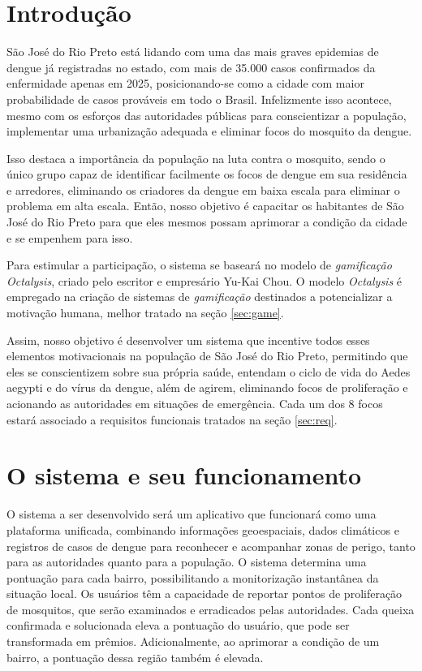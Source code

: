\documentclass[a5paper, 12pt]{article}
\begin{document}
\section{Introdução}

São José do Rio Preto está lidando com uma das mais graves epidemias de dengue já registradas no estado, com mais de 35.000 casos confirmados da enfermidade apenas em 2025, posicionando-se como a cidade com maior probabilidade de casos prováveis em todo o Brasil. Infelizmente isso acontece, mesmo com os esforços das autoridades públicas para conscientizar a população, implementar uma urbanização adequada e eliminar focos do mosquito da dengue.

Isso destaca a importância da população na luta contra o mosquito, sendo o único grupo capaz de identificar facilmente os focos de dengue em sua residência e arredores, eliminando os criadores da dengue em baixa escala para eliminar o problema em alta escala. Então, nosso objetivo é capacitar os habitantes de São José do Rio Preto para que eles mesmos possam aprimorar a condição da cidade e se empenhem para isso.

Para estimular a participação, o sistema se baseará no modelo de \textit{gamificação} \textit{Octalysis}, criado pelo escritor e empresário Yu-Kai Chou.  O modelo \textit{Octalysis} é empregado na criação de sistemas de \textit{gamificação} destinados a potencializar a motivação humana, melhor tratado na seção \ref{sec:game}.

Assim, nosso objetivo é desenvolver um sistema que incentive todos esses elementos motivacionais na população de São José do Rio Preto, permitindo que eles se conscientizem sobre sua própria saúde, entendam o ciclo de vida do Aedes aegypti e do vírus da dengue, além de agirem, eliminando focos de proliferação e acionando as autoridades em situações de emergência. Cada um dos 8 focos estará associado a requisitos funcionais tratados na seção \ref{sec:req}.

\newpage
\section{O sistema e seu funcionamento}

O sistema a ser desenvolvido será  um aplicativo que funcionará como uma plataforma unificada, combinando informações geoespaciais, dados climáticos e registros de casos de dengue para reconhecer e acompanhar zonas de perigo, tanto para as autoridades quanto para a população. O sistema determina uma pontuação para cada bairro, possibilitando a monitorização instantânea da situação local. Os usuários têm a capacidade de reportar pontos de proliferação de mosquitos, que serão examinados e erradicados pelas autoridades. Cada queixa confirmada e solucionada eleva a pontuação do usuário, que pode ser transformada em prêmios. Adicionalmente, ao aprimorar a condição de um bairro, a pontuação dessa região também é elevada.
\end{document}

